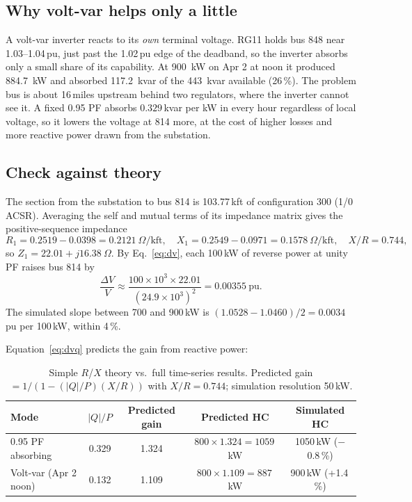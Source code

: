 \documentclass[11pt,letterpaper]{article}
\begin{document}
\subsection{Why volt-var helps only a little}
A volt-var inverter reacts to its \emph{own} terminal voltage. RG11 holds bus 848 near 1.03--1.04\,pu, just past
the 1.02\,pu edge of the deadband, so the inverter absorbs only a small share of its capability. At
\SI{900}{kW} on Apr 2 at noon it produced \SI{884.7}{kW} and absorbed \SI{117.2}{kvar} of the \SI{443}{kvar}
available (26\,\%). The problem bus is about 16\,miles upstream behind two regulators, where the inverter cannot
see it. A fixed 0.95 PF absorbs $0.329$\,kvar per kW in every hour regardless of local voltage, so it lowers
the voltage at 814 more, at the cost of higher losses and more reactive power drawn from the substation.

\subsection{Check against theory}
\label{sec:theorycheck}
The section from the substation to bus 814 is 103.77\,kft of configuration 300 (1/0 ACSR). Averaging the
self and mutual terms of its impedance matrix gives the positive-sequence impedance
\[
  R_1 = 0.2519-0.0398 = 0.2121\ \Omega/\text{kft}, \quad
  X_1 = 0.2549-0.0971 = 0.1578\ \Omega/\text{kft}, \quad X/R = 0.744,
\]
so $Z_1 = 22.01 + j16.38\ \Omega$. By Eq.~\eqref{eq:dv}, each 100\,kW of reverse power at unity PF raises bus
814 by
\[
  \frac{\Delta V}{V} \approx \frac{100\times10^3 \times 22.01}{(24.9\times10^3)^2} = 0.00355\ \text{pu}.
\]
The simulated slope between 700 and 900\,kW is $(1.0528-1.0460)/2 = 0.0034$\,pu per 100\,kW, within 4\,\%.

Equation~\eqref{eq:dvq} predicts the gain from reactive power:

\begin{table}[H]
\centering
\small
\begin{tabular}{@{}lcccc@{}}
\toprule
Mode & $|Q|/P$ & Predicted gain & Predicted HC & Simulated HC \\
\midrule
0.95 PF absorbing & 0.329 & 1.324 & $800\times1.324 = 1059$\,kW & 1050\,kW ($-$0.8\,\%) \\
Volt-var (Apr 2 noon) & 0.132 & 1.109 & $800\times1.109 = 887$\,kW & 900\,kW (+1.4\,\%) \\
\bottomrule
\end{tabular}
\caption{Simple $R$/$X$ theory vs.\ full time-series results. Predicted gain $=1/(1-(|Q|/P)(X/R))$ with $X/R=0.744$; simulation resolution 50\,kW.}
\label{tab:theory}
\end{table}
\end{document}
